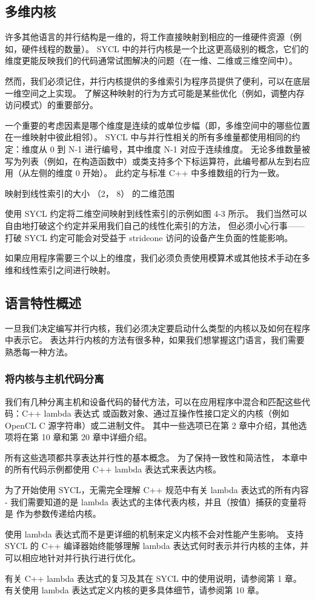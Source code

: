 \subsection{多维内核}
许多其他语言的并行结构是一维的，将工作直接映射到相应的一维硬件资源（例如，硬件线程的数量）。 
SYCL 中的并行内核是一个比这更高级别的概念，它们的维度更能反映我们的代码通常试图解决的问题（在一维、二维或三维空间中）。

然而，我们必须记住，并行内核提供的多维索引为程序员提供了便利，可以在底层一维空间之上实现。 
了解这种映射的行为方式可能是某些优化（例如，调整内存访问模式）的重要部分。

一个重要的考虑因素是哪个维度是连续的或单位步幅（即，多维空间中的哪些位置在一维映射中彼此相邻）。 
SYCL 中与并行性相关的所有多维量都使用相同的约定：维度从 0 到 N-1 进行编号，其中维度 N-1 对应于连续维度。 
无论多维数量被写为列表（例如，在构造函数中）或类支持多个下标运算符，此编号都从左到右应用（从左侧的维度 0 开始）。 
此约定与标准 C++ 中多维数组的行为一致。

{\color{red} 映射到线性索引的大小 （2， 8） 的二维范围}

使用 SYCL 约定将二维空间映射到线性索引的示例如图 4-3 所示。 
我们当然可以自由地打破这个约定并采用我们自己的线性化索引的方法，
但必须小心行事——打破 SYCL 约定可能会对受益于 strideone 访问的设备产生负面的性能影响。

如果应用程序需要三个以上的维度，我们必须负责使用模算术或其他技术手动在多维和线性索引之间进行映射。

\subsection{语言特性概述}
一旦我们决定编写并行内核，我们必须决定要启动什么类型的内核以及如何在程序中表示它。 
表达并行内核的方法有很多种，如果我们想掌握这门语言，我们需要熟悉每一种方法。

\subsubsection{将内核与主机代码分离}
我们有几种分离主机和设备代码的替代方法，可以在应用程序中混合和匹配这些代码：C++ lambda 表达式
或函数对象、通过互操作性接口定义的内核（例如 OpenCL C 源字符串）或二进制文件。 
其中一些选项已在第 2 章中介绍，其他选项将在第 10 章和第 20 章中详细介绍。

所有这些选项都共享表达并行性的基本概念。 为了保持一致性和简洁性，
本章中的所有代码示例都使用 C++ lambda 表达式来表达内核。

\begin{remark}
为了开始使用 SYCL，无需完全理解 C++ 规范中有关 lambda 表达式的所有内容 - 
我们需要知道的是 lambda 表达式的主体代表内核，并且（按值）捕获的变量将是 作为参数传递给内核。

使用 lambda 表达式而不是更详细的机制来定义内核不会对性能产生影响。 
支持 SYCL 的 C++ 编译器始终能够理解 lambda 表达式何时表示并行内核的主体，并可以相应地针对并行执行进行优化。

有关 C++ lambda 表达式的复习及其在 SYCL 中的使用说明，请参阅第 1 章。
有关使用 lambda 表达式定义内核的更多具体细节，请参阅第 10 章。
\end{remark}

